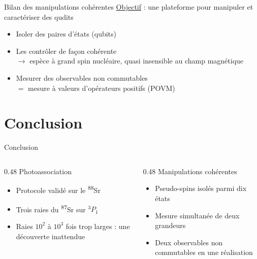 \documentclass[aspectratio=169, 11pt]{beamer}
\newcommand{\Sr}[1]{\textsuperscript{#1}Sr}
\begin{document}
\begin{frame}{Bilan des manipulations cohérentes}
  \centering
  {\large\color{violet}\underline{Objectif} : une plateforme pour manipuler et caractériser des qudits}\par
  \vspace{0.4cm}
  \begin{minipage}{0.75\textwidth}
    \begin{itemize}
      \item Isoler des paires d'états (qubits)
      \item Les contrôler de façon cohérente\\
        $\to$ espèce à grand spin nucléaire, quasi insensible au champ magnétique
      \item Mesurer des observables non commutables\\
        $=$ mesure à valeurs d'opérateurs positifs (POVM)
    \end{itemize}
  \end{minipage}
\end{frame}

\section{Conclusion}

\begin{frame}{Conclusion}
  \begin{columns}[t]
    \begin{column}{0.48\textwidth}
      {\fontforte\color{violet} Photoassociation}\par\vspace{0.2cm}
      \begin{itemize}
        \item Protocole validé sur le \Sr{88}
        \item Trois raies du \Sr{87} sur $^3P_1$
        \item Raies $10^2$ à $10^3$ fois trop larges : une découverte inattendue
      \end{itemize}
    \end{column}
    \begin{column}{0.48\textwidth}
      {\fontforte\color{vert} Manipulations cohérentes}\par\vspace{0.2cm}
      \begin{itemize}
        \item Pseudo-spins isolés parmi dix états
        \item Mesure simultanée de deux grandeurs
        \item Deux observables non commutables en une réalisation
      \end{itemize}
    \end{column}
  \end{columns}
\end{frame}
\end{document}
